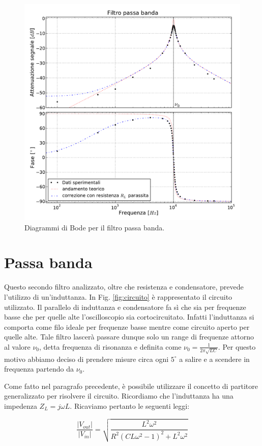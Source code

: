 \begin{figure}
    \includegraphics[width=115mm]{bpf.pdf}
    \caption{Diagrammi di Bode per il filtro passa banda.}
    \label{fig:bpf}
\end{figure}

\section{Passa banda}
Questo secondo filtro analizzato, oltre che resistenza e condensatore, prevede l'utilizzo di un'induttanza. In Fig. \ref{fig:circuito} è rappresentato il circuito utilizzato. Il parallelo di induttanza e condensatore fa sì che sia per frequenze basse che per quelle alte l'oscilloscopio sia cortocircuitato. Infatti l'induttanza si comporta come filo ideale per frequenze basse mentre come circuito aperto per quelle alte. Tale filtro lascerà passare dunque solo un range di frequenze attorno al valore $\nu_0$, detta frequenza di risonanza e definita come $\nu_0=\frac{1}{2 \pi \sqrt{LC}}$. Per questo motivo abbiamo deciso di prendere misure circa ogni $5^\circ$ a salire e a scendere in frequenza partendo da $\nu_0$.

Come fatto nel paragrafo precedente, è possibile utilizzare il concetto di partitore generalizzato per risolvere il circuito. Ricordiamo che l'induttanza ha una impedenza $Z_L=j\omega L$. Ricaviamo pertanto le seguenti leggi:

\begin{equation}
\frac{|V_{out}|}{|V_{in}|}=\sqrt{\frac{L^2 \omega ^2}{R^2 \left(C L \omega ^2-1\right)^2+L^2 \omega ^2}}
\label{eq:bpfGain}
\end{equation}

